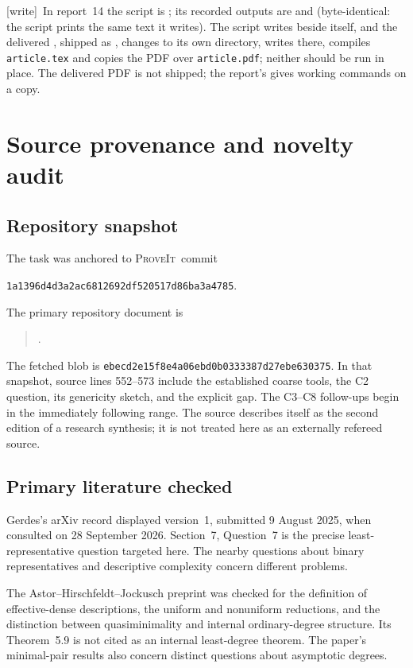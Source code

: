 \documentclass[11pt,a4paper]{article}
\newcommand{\repo}{\textsc{ProveIt}}
\theoremstyle{definition}
\theoremstyle{remark}
\newcommand{\wtag}{\textup{[write]}}
\begin{document}
\noindent\wtag\ In report~14 the script is ; its
recorded outputs are  and 
(byte-identical: the script prints the same text it writes). The script
writes  beside itself, and the delivered
, shipped as , changes to its own
directory, writes  there, compiles
\texttt{article.tex} and copies the PDF over \texttt{article.pdf}; neither
should be run in place. The delivered PDF is not shipped; the report's
 gives working commands on a copy.

\appendix
\section{Source provenance and novelty audit}
\label{cr14:app:sources}
\subsection{Repository snapshot}
The task was anchored to \repo\ commit
\begin{center}
\texttt{1a1396d4d3a2ac6812692df520517d86ba3a4785}.
\end{center}
The primary repository document is
\begin{quote}\small
{}\allowbreak
{}.
\end{quote}
The fetched blob is
\texttt{ebecd2e15f8e4a06ebd0b0333387d27ebe630375}.
In that snapshot, source lines 552--573 include the established coarse
tools, the C2 question, its genericity sketch, and the explicit gap.
The C3--C8 follow-ups begin in the immediately following range.
The source describes itself as the second edition of a research synthesis;
it is not treated here as an externally refereed source.

\subsection{Primary literature checked}
Gerdes's arXiv record displayed version~1, submitted 9 August 2025, when
consulted on 28 September 2026. Section~7, Question~7 is the precise
least-representative question targeted here. The nearby questions about
binary representatives and descriptive complexity concern different
problems.\cite{Gerdes}

The Astor--Hirschfeldt--Jockusch preprint was checked for the definition of
effective-dense descriptions, the uniform and nonuniform reductions, and
the distinction between quasiminimality and internal ordinary-degree
structure. Its Theorem~5.9 is not cited as an internal least-degree theorem.
The paper's minimal-pair results also concern distinct questions about
asymptotic degrees.\cite{AHJ}
\end{document}
